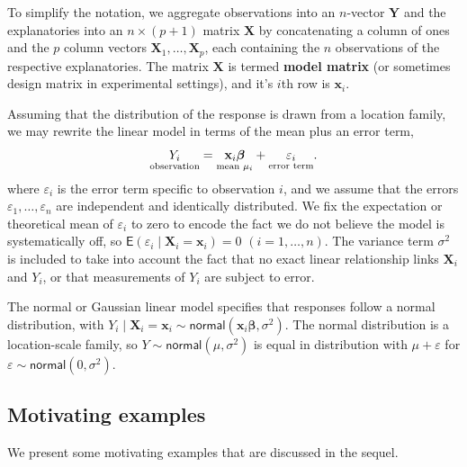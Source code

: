 \documentclass[
  11pt,
  letterpaper,
]{scrbook}
\theoremstyle{plain}
\theoremstyle{definition}
\theoremstyle{definition}
\theoremstyle{plain}
\theoremstyle{remark}
\begin{document}
To simplify the notation, we aggregate observations into an \(n\)-vector
\(\boldsymbol{Y}\) and the explanatories into an \(n \times (p+1)\)
matrix \(\mathbf{X}\) by concatenating a column of ones and the \(p\)
column vectors \(\boldsymbol{X}_1, \ldots, \boldsymbol{X}_p\), each
containing the \(n\) observations of the respective explanatories. The
matrix \(\mathbf{X}\) is termed \textbf{model matrix} (or sometimes
design matrix in experimental settings), and it's \(i\)th row is
\(\mathbf{x}_i\).

Assuming that the distribution of the response is drawn from a location
family, we may rewrite the linear model in terms of the mean plus an
error term, \begin{align*}
\underset{\text{observation}\vphantom{\mu_i}}{Y_i} = \underset{\text{mean } \mu_i}{\vphantom{Y_i}\mathbf{x}_i\boldsymbol{\beta}} + \underset{\text{error term}\vphantom{\mu_i}}{\vphantom{Y_i}\varepsilon_i}.
\end{align*} where \(\varepsilon_i\) is the error term specific to
observation \(i\), and we assume that the errors
\(\varepsilon_1, \ldots, \varepsilon_n\) are independent and identically
distributed. We fix the expectation or theoretical mean of
\(\varepsilon_i\) to zero to encode the fact we do not believe the model
is systematically off, so
\(\mathsf{E}(\varepsilon_i \mid \boldsymbol{X}_i=\boldsymbol{x}_i)=0\)
\((i=1, \ldots, n)\). The variance term \(\sigma^2\) is included to take
into account the fact that no exact linear relationship links
\(\boldsymbol{X}_i\) and \(Y_i\), or that measurements of \(Y_i\) are
subject to error.

The normal or Gaussian linear model specifies that responses follow a
normal distribution, with
\(Y_i \mid \boldsymbol{X}_i=\boldsymbol{x}_i \sim \mathsf{normal}(\mathbf{x}_i\boldsymbol{\beta}, \sigma^2)\).
The normal distribution is a location-scale family, so
\(Y \sim \mathsf{normal}(\mu, \sigma^2)\) is equal in distribution with
\(\mu + \varepsilon\) for
\(\varepsilon \sim \mathsf{normal}(0, \sigma^2)\).

\subsection{Motivating examples}\label{motivating-examples}

We present some motivating examples that are discussed in the sequel.
\end{document}
